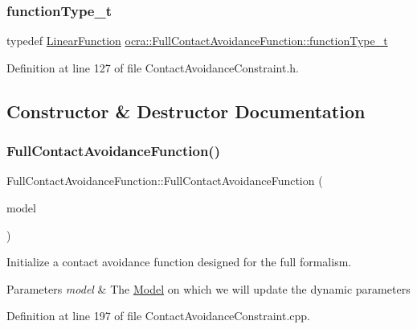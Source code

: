 \subsubsection{\texorpdfstring{function\+Type\+\_\+t}{functionType\_t}}
{\footnotesize\ttfamily typedef \hyperlink{classocra_1_1LinearFunction}{Linear\+Function} \hyperlink{classocra_1_1FullContactAvoidanceFunction_a9b59cb139be82095188084893d70b996}{ocra\+::\+Full\+Contact\+Avoidance\+Function\+::function\+Type\+\_\+t}}



Definition at line 127 of file Contact\+Avoidance\+Constraint.\+h.



\subsection{Constructor \& Destructor Documentation}
\hypertarget{classocra_1_1FullContactAvoidanceFunction_aa1632bec7158003ab2da17f71aa134e0}{}\label{classocra_1_1FullContactAvoidanceFunction_aa1632bec7158003ab2da17f71aa134e0} 
\subsubsection{\texorpdfstring{Full\+Contact\+Avoidance\+Function()}{FullContactAvoidanceFunction()}}
{\footnotesize\ttfamily Full\+Contact\+Avoidance\+Function\+::\+Full\+Contact\+Avoidance\+Function (\begin{DoxyParamCaption}\item[{const \hyperlink{classocra_1_1Model}{Model} \&}]{model }\end{DoxyParamCaption})}

Initialize a contact avoidance function designed for the full formalism.


\begin{DoxyParams}{Parameters}
{\em model} & The \hyperlink{classocra_1_1Model}{Model} on which we will update the dynamic parameters \\
\hline
\end{DoxyParams}


Definition at line 197 of file Contact\+Avoidance\+Constraint.\+cpp.

